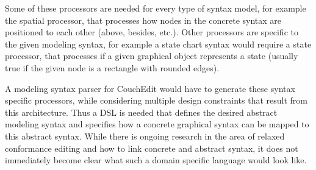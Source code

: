 \documentclass[10pt,a4paper,oneside]{scrartcl}
\begin{document}
Some of these processors are needed for every type of syntax model, for example the spatial processor, that processes how nodes in the concrete syntax are positioned to each other (above, besides, etc.). Other processors are specific to the given modeling syntax, for example a state chart syntax would require a state processor, that processes if a given graphical object represents a state (usually true if the given node is a rectangle with rounded edges).

A modeling syntax parser for CouchEdit would have to generate these syntax specific processors, while considering multiple design constraints that result from this architecture. Thus a DSL is needed that defines the desired abstract modeling syntax and specifies how a concrete graphical syntax can be mapped to this abstract syntax. While there is ongoing research in the area of relaxed conformance editing and how to link concrete and abstract syntax, it does not immediately become clear what such a domain specific language would look like.







\end{document}
